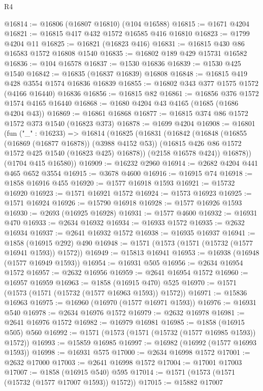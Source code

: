 \begin{lexlean}{R4}
\begin{coremodule}
@16814 := @16806 (@16807 @16810) (@104 @16588)
@16815 := @1671 @4204
@16821 := @16815 @417 @432 @1572 @16585 @416 @16810
@16823 := @1799 @4204 @11
@16825 := @16821 (@16823 @416)
@16831 := @16815 @430 @86 @16583 @1572 @16808 @1540
@16835 := @16802 @189 @429 @15731 @16582
@16836 := @104 @16578
@16837 := @1530 @16836
@16839 := @1530 @425 @1540
@16842 := @16835 (@16837 @16839) @16808
@16848 := @16815 @419 @428 @3554 @1574 @16836 @16839
@16855 := @16802 @343 @377 @1575 @1572 (@4166 @16440) @16836
@16856 := @16815 @82
@16861 := @16856 @376 @1572 @1574 @4165 @16440
@16868 := @1680 @4204 @43 @4165 (@1685 (@1686 @4204 @43))
@16869 := @16861 @16868
@16877 := @16815 @374 @86 @1572 @1572 @373 @1540 (@16823 @373)
@16878 := @1699 @4204
@16908 := @16801
    (fun ("_" : @16233) =>
    @16814
      (@16825
        (@16831
          (@16842
            (@16848
              (@16855 (@16869 (@16877 @16878)) (@3988 @4152 @53))
              (@16815 @426 @86 @1572 @1572 @425 @1540 (@16823 @425) @16878))
            (@2158 @16578 @424))
          @16878))
      (@1704 @415 @16580))
@16909 := @16232 @2960
@16914 := @2682 @4204 @441 @465 @652 @3554
@16915 := @3678 @4600
@16916 := @16915 @74
@16918 := @1858 @16916 @455
@16920 := @1577 @16918 @1593
@16921 := @15732 @16920
@16923 := @1571 @16921 @1572
@16924 := @1573 @16923
@16925 := @1571 @16924
@16926 := @15790 @16918
@16928 := @1577 @16926 @1593
@16930 := @2693 (@16925 @16928)
@16931 := @1577 @4600
@16932 := @16931 @470
@16933 := @2634 @16932
@16934 := @16933 @1572
@16935 := @2632 @16934
@16937 := @2641 @16932 @1572
@16938 := @16935 @16937
@16941 := @1858 (@16915 @292) @490
@16948 := @1571 (@1573 (@1571 (@15732 (@1577 @16941 @1593)) @1572))
@16949 := @15813 @16941
@16953 := @16938 (@16948 (@1577 @16949 @1593))
@16954 := @16931 @505
@16956 := @2634 @16954 @1572
@16957 := @2632 @16956
@16959 := @2641 @16954 @1572
@16960 := @16957 @16959
@16963 := @1858 (@16915 @470) @525
@16970 := @1571 (@1573 (@1571 (@15732 (@1577 @16963 @1593)) @1572))
@16971 := @15836 @16963
@16975 := @16960 (@16970 (@1577 @16971 @1593))
@16976 := @16931 @540
@16978 := @2634 @16976 @1572
@16979 := @2632 @16978
@16981 := @2641 @16976 @1572
@16982 := @16979 @16981
@16985 := @1858 (@16915 @505) @560
@16992 := @1571 (@1573 (@1571 (@15732 (@1577 @16985 @1593)) @1572))
@16993 := @15859 @16985
@16997 := @16982 (@16992 (@1577 @16993 @1593))
@16998 := @16931 @575
@17000 := @2634 @16998 @1572
@17001 := @2632 @17000
@17003 := @2641 @16998 @1572
@17004 := @17001 @17003
@17007 := @1858 (@16915 @540) @595
@17014 := @1571 (@1573 (@1571 (@15732 (@1577 @17007 @1593)) @1572))
@17015 := @15882 @17007

\end{coremodule}
\end{lexlean}
